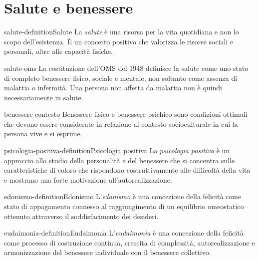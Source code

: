 \documentclass[preview]{standalone}
\begin{document}
\genpage

\section{Salute e benessere}

\begin{snippetdefinition}{salute-definition}{Salute}
    La \emph{salute} è una risorsa per la vita quotidiana e non lo scopo
    dell'esistenza. È un concetto positivo che valorizza le risorse sociali e
    personali, oltre alle capacità fisiche.
\end{snippetdefinition}

\begin{snippet}{salute-oms}
    La costituzione dell'OMS del 1948 definisce la salute come uno stato di
    completo benessere fisico, sociale e mentale, non soltanto come assenza di
    malattia o infermità. Una persona non affetta da malattia non è quindi
    necessariamente in salute.
\end{snippet}

\begin{snippet}{benessere-contesto}
    Benessere fisico e benessere psichico sono condizioni ottimali che devono
    essere considerate in relazione al contesto socioculturale in cui la persona
    vive e si esprime.
\end{snippet}

\begin{snippetdefinition}{psicologia-positiva-definition}{Psicologia positiva}
    La \emph{psicologia positiva} è un approccio allo studio della personalità e
    del benessere che si concentra sulle caratteristiche di coloro che rispondono
    costruttivamente alle difficoltà della vita e mostrano una forte motivazione
    all'autorealizzazione.
\end{snippetdefinition}

\begin{snippetdefinition}{edonismo-definition}{Edonismo}
    L'\emph{edonismo} è una concezione della felicità come stato di appagamento
    connesso al raggiungimento di un equilibrio omeostatico ottenuto attraverso
    il soddisfacimento dei desideri.
\end{snippetdefinition}


\begin{snippetdefinition}{eudaimonia-definition}{Eudaimonia}
    L'\emph{eudaimonia} è una concezione della felicità come processo di
    costruzione continua, crescita di complessità, autorealizzazione e
    armonizzazione del benessere individuale con il benessere collettivo.
\end{snippetdefinition}
\end{document}
